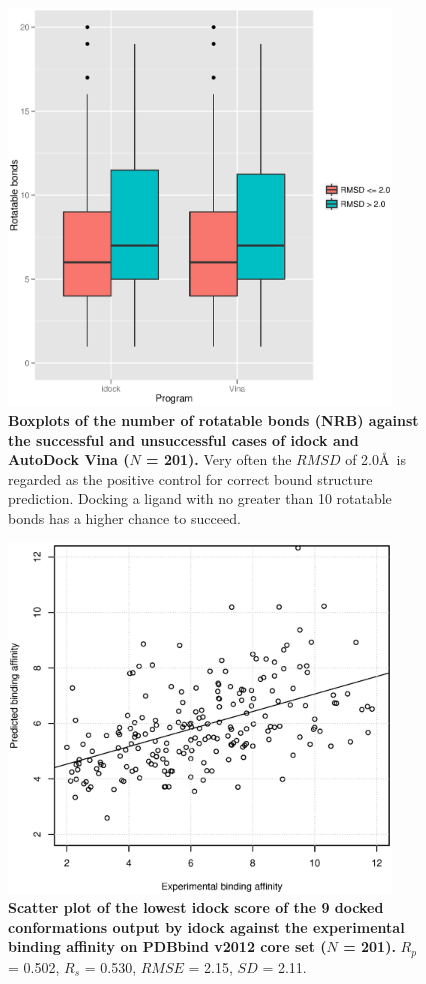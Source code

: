 \documentclass[10pt]{article}
\begin{document}
\begin{figure}[!ht]
\begin{center}
\includegraphics[width=4in]{Program-NRB.eps}
\end{center}
\caption{
{\bf Boxplots of the number of rotatable bonds (NRB) against the successful and unsuccessful cases of idock and AutoDock Vina ($N$ = 201).} Very often the $RMSD$ of 2.0\AA\ is regarded as the positive control for correct bound structure prediction. Docking a ligand with no greater than 10 rotatable bonds has a higher chance to succeed.
}
\label{Program-NRB}
\end{figure}

\begin{figure}[!ht]
\begin{center}
\includegraphics[width=4in]{pK-idockConf1idock.eps}
\end{center}
\caption{
{\bf Scatter plot of the lowest idock score of the 9 docked conformations output by idock against the experimental binding affinity on PDBbind v2012 core set ($N$ = 201).} $R_p$ = 0.502, $R_s$ = 0.530, $RMSE$ = 2.15, $SD$ = 2.11.
}
\label{pK-idockConf1idock}
\end{figure}
\end{document}
